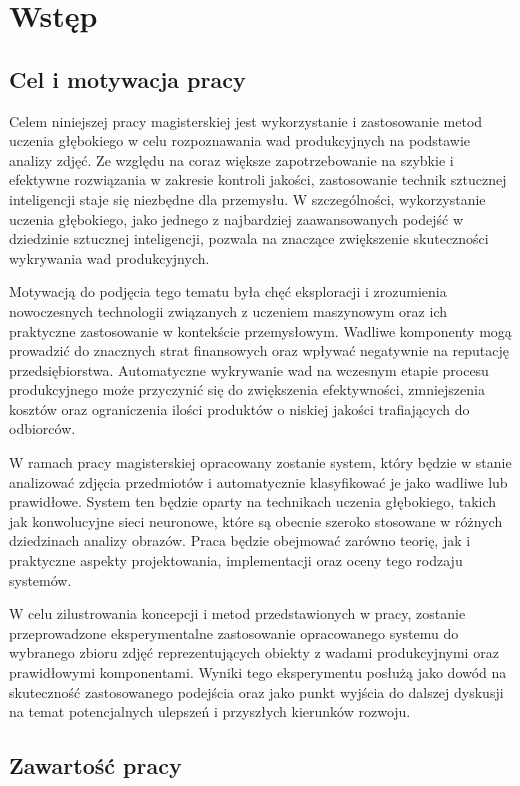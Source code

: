 \chapter{Wstęp}
\section{Cel i motywacja pracy}

Celem niniejszej pracy magisterskiej jest wykorzystanie i zastosowanie metod uczenia głębokiego w celu rozpoznawania wad produkcyjnych na podstawie analizy zdjęć. Ze względu na coraz większe zapotrzebowanie na szybkie i efektywne rozwiązania w zakresie kontroli jakości, zastosowanie technik sztucznej inteligencji staje się niezbędne dla przemysłu. W szczególności, wykorzystanie uczenia głębokiego, jako jednego z najbardziej zaawansowanych podejść w dziedzinie sztucznej inteligencji, pozwala na znaczące zwiększenie skuteczności wykrywania wad produkcyjnych.

Motywacją do podjęcia tego tematu była chęć eksploracji i zrozumienia nowoczesnych technologii związanych z uczeniem maszynowym oraz ich praktyczne zastosowanie w kontekście przemysłowym. Wadliwe komponenty mogą prowadzić do znacznych strat finansowych oraz wpływać negatywnie na reputację przedsiębiorstwa. Automatyczne wykrywanie wad na wczesnym etapie procesu produkcyjnego może przyczynić się do zwiększenia efektywności, zmniejszenia kosztów oraz ograniczenia ilości produktów o niskiej jakości trafiających do odbiorców.

W ramach pracy magisterskiej opracowany zostanie system, który będzie w stanie analizować zdjęcia przedmiotów i automatycznie klasyfikować je jako wadliwe lub prawidłowe. System ten będzie oparty na technikach uczenia głębokiego, takich jak konwolucyjne sieci neuronowe, które są obecnie szeroko stosowane w różnych dziedzinach analizy obrazów. Praca będzie obejmować zarówno teorię, jak i praktyczne aspekty projektowania, implementacji oraz oceny tego rodzaju systemów.

W celu zilustrowania koncepcji i metod przedstawionych w pracy, zostanie przeprowadzone eksperymentalne zastosowanie opracowanego systemu do wybranego zbioru zdjęć reprezentujących obiekty z wadami produkcyjnymi oraz prawidłowymi komponentami. Wyniki tego eksperymentu posłużą jako dowód na skuteczność zastosowanego podejścia oraz jako punkt wyjścia do dalszej dyskusji na temat potencjalnych ulepszeń i przyszłych kierunków rozwoju.

\section{Zawartość pracy}